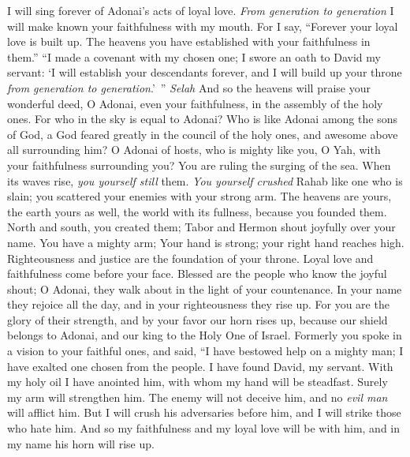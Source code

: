 \begin{biblechapter} %
 I will sing forever of Adonai’s acts of loyal love. 
\textit{From generation to generation} 
I will make known your faithfulness with my mouth.
\verse For I say, “Forever your loyal love is built up. 
The heavens you have established with your faithfulness in them.”
\verse “I made a covenant with my chosen one; 
I swore an oath to David my servant:
\verse ‘I will establish your descendants forever, 
and I will build up your throne \textit{from generation to generation}.’ ” \textit{Selah}
\verse And so the heavens will praise your wonderful deed, O Adonai, 
even your faithfulness, in the assembly of the holy ones.
\verse For who in the sky is equal to Adonai? 
Who is like Adonai among the sons of God,
\verse a God feared greatly in the council of the holy ones, 
and awesome above all surrounding him?
\verse O Adonai of hosts, 
who is mighty like you, O Yah, 
with your faithfulness surrounding you?
\verse You are ruling the surging of the sea. 
When its waves rise, \textit{you yourself still} them.
\verse \textit{You yourself crushed} Rahab like one who is slain; 
you scattered your enemies with your strong arm.
\verse The heavens are yours, the earth yours as well, 
the world with its fullness, because you founded them.
\verse North and south, you created them; 
Tabor and Hermon shout joyfully over your name.
\verse You have a mighty arm; 
Your hand is strong; your right hand reaches high.
\verse Righteousness and justice are the foundation of your throne. 
Loyal love and faithfulness come before your face.
\verse Blessed are the people who know the joyful shout; 
O Adonai, they walk about in the light of your countenance.
\verse In your name they rejoice all the day, 
and in your righteousness they rise up.
\verse For you are the glory of their strength, 
and by your favor our horn rises up,
\verse because our shield belongs to Adonai, 
and our king to the Holy One of Israel.
\verse Formerly you spoke in a vision 
to your faithful ones, and said, 
“I have bestowed help on a mighty man; 
I have exalted one chosen from the people.
\verse I have found David, my servant. 
With my holy oil I have anointed him,
\verse with whom my hand will be steadfast. 
Surely my arm will strengthen him.
\verse The enemy will not deceive him, 
and no \textit{evil man} will afflict him.
\verse But I will crush his adversaries before him, 
and I will strike those who hate him.
\verse And so my faithfulness 
and my loyal love will be with him, 
and in my name his horn will rise up.

\end{biblechapter}
